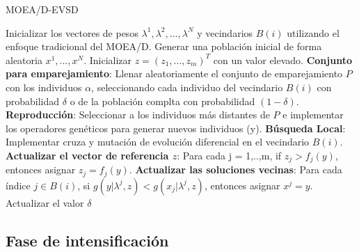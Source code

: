 \begin{algorithm}[!t]
\caption{MOEA/D-EVSD}\label{alg:MOEAD_EVSD}
\begin{scriptsize}
\begin{algorithmic}[1]
    \STATE Inicializar los vectores de pesos $\lambda^1, \lambda^2, ..., \lambda^N$ y vecindarios $B(i)$ utilizando el enfoque tradicional del MOEA/D. \label{alg:Inicializar_Vectores_Pesos}
    \STATE Generar una población inicial de forma aleatoria $x^1, ..., x^N$.
    \STATE Inicializar $z = (z_1, ..., z_m)^T$ con un valor elevado. \label{alg:Inicializar_Referencia}
    \STATE \textbf{Conjunto para emparejamiento}: Llenar aleatoriamente el conjunto de emparejamiento $P$ con los individuos $\alpha$, seleccionando cada individuo del vecindario $B(i)$ con probabilidad $\delta$ o de la población complta con probabilidad $(1 - \delta)$. \label{alg:Emparejamiento}
    \STATE \textbf{Reproducción}: Seleccionar a los individuos más distantes de $P$ e implementar los operadores genéticos para generar nuevos individuos (y).
	\STATE \textbf{Búsqueda Local}: Implementar cruza y mutación de evolución diferencial en el vecindario $B(i)$. \label{alg:Busqueda_Local}
    \ENDIF
    \STATE \textbf{Actualizar el vector de referencia $z$}: Para cada j = 1,..,m, if $z_j > f_j(y)$, entonces asignar $z_j = f_j(y)$.
    \STATE \textbf{Actualizar las soluciones vecinas}: Para cada índice $j \in B(i)$, si $g(y| \lambda^j, z) < g(x_j| \lambda^j, z)$, entonces asignar $x^j = y$.\label{alg:Actualizar_Vecindarios}
    \ENDFOR
       \STATE Actualizar el valor $\delta$
  \ENDWHILE
\end{algorithmic}
\end{scriptsize}
\end{algorithm}


\subsection{Fase de intensificación}

